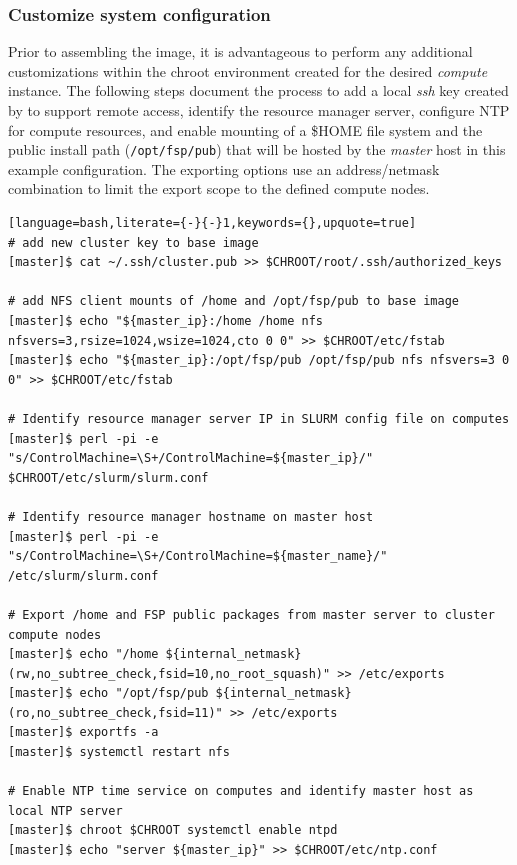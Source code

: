 \documentclass[letterpaper]{article}
\begin{document}

\subsubsection{Customize system configuration} \label{sec:master_customization}

Prior to assembling the image, it is advantageous to perform any additional
customizations within the chroot environment created for the desired {\em
  compute} instance. The following steps document the process to add a local
{\em ssh} key created by \Warewulf{} to support remote access, identify the
resource manager server, configure NTP for compute resources, and enable \NFS{}
mounting of a \$HOME file system and the public \FSP{} install path
(\texttt{/opt/fsp/pub}) that will be hosted by the {\em master} host in this
example configuration.  The \NFS{} exporting options use an address/netmask
combination to limit the export scope to the defined compute nodes.

\begin{lstlisting}[language=bash,literate={-}{-}1,keywords={},upquote=true]
# add new cluster key to base image
[master]$ cat ~/.ssh/cluster.pub >> $CHROOT/root/.ssh/authorized_keys

# add NFS client mounts of /home and /opt/fsp/pub to base image
[master]$ echo "${master_ip}:/home /home nfs nfsvers=3,rsize=1024,wsize=1024,cto 0 0" >> $CHROOT/etc/fstab
[master]$ echo "${master_ip}:/opt/fsp/pub /opt/fsp/pub nfs nfsvers=3 0 0" >> $CHROOT/etc/fstab

# Identify resource manager server IP in SLURM config file on computes
[master]$ perl -pi -e "s/ControlMachine=\S+/ControlMachine=${master_ip}/" $CHROOT/etc/slurm/slurm.conf

# Identify resource manager hostname on master host
[master]$ perl -pi -e "s/ControlMachine=\S+/ControlMachine=${master_name}/" /etc/slurm/slurm.conf

# Export /home and FSP public packages from master server to cluster compute nodes
[master]$ echo "/home ${internal_netmask}(rw,no_subtree_check,fsid=10,no_root_squash)" >> /etc/exports
[master]$ echo "/opt/fsp/pub ${internal_netmask}(ro,no_subtree_check,fsid=11)" >> /etc/exports
[master]$ exportfs -a
[master]$ systemctl restart nfs

# Enable NTP time service on computes and identify master host as local NTP server
[master]$ chroot $CHROOT systemctl enable ntpd
[master]$ echo "server ${master_ip}" >> $CHROOT/etc/ntp.conf
\end{lstlisting}
\end{document}
